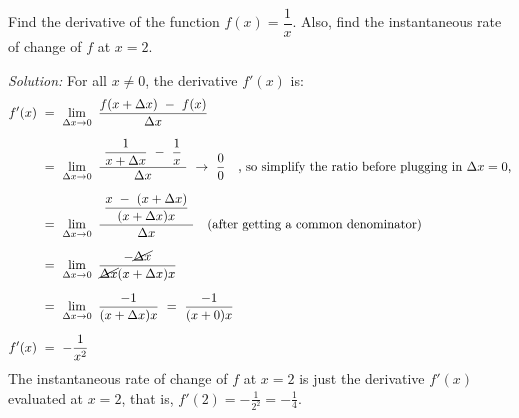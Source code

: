 \begin{exmp}
 Find the derivative of the function $f(x) = \dfrac{1}{x}$. Also, find the
 instantaneous rate of change of $f$ at $x=2$.\vspace{1mm}
 \par\noindent\emph{Solution:} For all $x \ne 0$, the derivative $f'(x)$ is:
 \begin{align*}
  f'(x) ~&=~ \lim_{\Delta x \to 0} ~\frac{f(x+\Delta x) ~-~ f(x)}
   {\Delta x}\\[6pt]
  &=~ \lim_{\Delta x \to 0} ~\frac{~\dfrac{1}{x + \Delta x} ~-~ \dfrac{1}{x}~}
      {\Delta x} ~\rightarrow~ \frac{0}{0}\quad\text{, so simplify the ratio
   before plugging in $\Delta x = 0$,}\\[6pt]
  &=~ \lim_{\Delta x \to 0} ~\frac{~\dfrac{x ~-~ (x + \Delta x)}
      {(x + \Delta x)x}~}{\Delta x}
      \quad\text{(after getting a common denominator)}\\[6pt]
  &=~ \lim_{\Delta x \to 0} ~\frac{-\cancel{\Delta x}}{\cancel{\Delta x}(x + \Delta x)x}\\[6pt]
  &=~ \lim_{\Delta x \to 0} ~\frac{-1}{(x + \Delta x)x} ~=~
      \frac{-1}{(x+0)x}\\[6pt]
  f'(x) ~&=~ -\frac{1}{x^2}
 \end{align*}
 The instantaneous rate of change of $f$ at $x=2$ is just the derivative $f'(x)$
 evaluated at $x=2$, that is, $f'(2) = -\frac{1}{2^2} = -\frac{1}{4}$.
\end{exmp}
\divider
\vspace{3mm}

